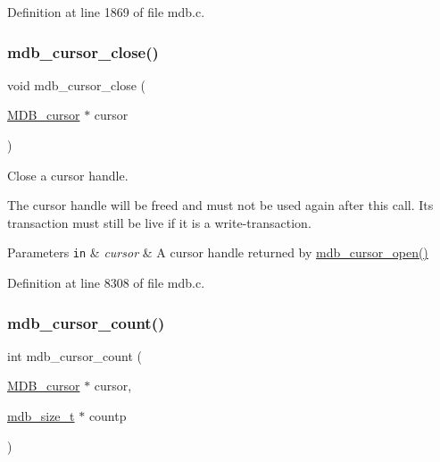 Definition at line 1869 of file mdb.\+c.

\mbox{\label{group__mdb_gad685f5d73c052715c7bd859cc4c05188}} 
\subsubsection{\texorpdfstring{mdb\+\_\+cursor\+\_\+close()}{mdb\_cursor\_close()}}
{\footnotesize\ttfamily void mdb\+\_\+cursor\+\_\+close (\begin{DoxyParamCaption}\item[{\mbox{\hyperlink{struct_m_d_b__cursor}{M\+D\+B\+\_\+cursor}} $\ast$}]{cursor }\end{DoxyParamCaption})}



Close a cursor handle. 

The cursor handle will be freed and must not be used again after this call. Its transaction must still be live if it is a write-\/transaction. 
\begin{DoxyParams}[1]{Parameters}
\mbox{\tt in}  & {\em cursor} & A cursor handle returned by \mbox{\hyperlink{group__mdb_ga9ff5d7bd42557fd5ee235dc1d62613aa}{mdb\+\_\+cursor\+\_\+open()}} \\
\hline
\end{DoxyParams}


Definition at line 8308 of file mdb.\+c.

\mbox{\label{group__mdb_ga182be40c73eae62dba8751477e5c0e26}} 
\subsubsection{\texorpdfstring{mdb\+\_\+cursor\+\_\+count()}{mdb\_cursor\_count()}}
{\footnotesize\ttfamily int mdb\+\_\+cursor\+\_\+count (\begin{DoxyParamCaption}\item[{\mbox{\hyperlink{struct_m_d_b__cursor}{M\+D\+B\+\_\+cursor}} $\ast$}]{cursor,  }\item[{\mbox{\hyperlink{lmdb_8h_a78821971e612e3898ef4b3ae45ed86f1}{mdb\+\_\+size\+\_\+t}} $\ast$}]{countp }\end{DoxyParamCaption})}



